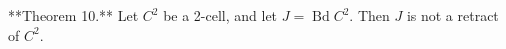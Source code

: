 **Theorem 10.** Let $C^2$ be a 2-cell, and let $J = \operatorname{Bd} C^2$. Then $J$ is not a retract of $C^2$.

